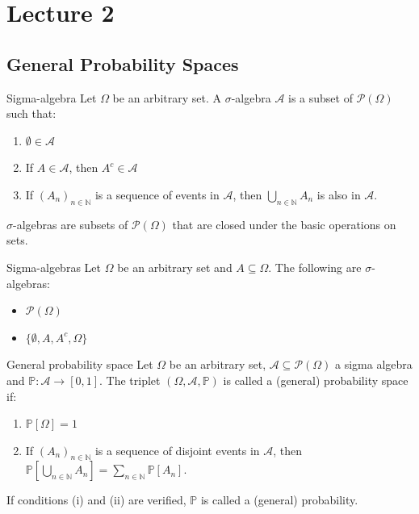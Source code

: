\documentclass[11pt, a4paper]{article}
\begin{document}

\section{Lecture 2}

\subsection{General Probability Spaces}

\begin{definition}{Sigma-algebra}{}
Let $\Omega$ be an arbitrary set. A $\sigma$-algebra $\mathscr{A}$ is a subset of $\mathcal{P}(\Omega)$ such that:
\begin{enumerate}
    \item $\emptyset \in \mathscr{A}$
    \item If $A \in \mathscr{A}$, then $A^c \in \mathscr{A}$
    \item If $(A_n)_{n \in \mathbb{N}}$ is a sequence of events in $\mathscr{A}$, then $\bigcup_{n \in \mathbb{N}} A_n$ is also in $\mathscr{A}$.
\end{enumerate}
$\sigma$-algebras are subsets of $\mathcal{P}(\Omega)$ that are closed under the basic operations on sets.
\end{definition}

\begin{example}{Sigma-algebras}{}
Let $\Omega$ be an arbitrary set and $A \subseteq \Omega$. The following are $\sigma$-algebras:
\begin{itemize}
    \item $\mathcal{P}(\Omega)$
    \item $\{\emptyset, A, A^c, \Omega\}$
\end{itemize}
\end{example}

\begin{definition}{General probability space}{}
Let $\Omega$ be an arbitrary set, $\mathscr{A} \subseteq \mathcal{P}(\Omega)$ a sigma algebra and $\mathbb{P}: \mathscr{A} \rightarrow [0,1]$. The triplet $(\Omega, \mathscr{A}, \mathbb{P})$ is called a (general) probability space if:
\begin{enumerate}
    \item $\mathbb{P}[\Omega] = 1$
    \item If $(A_n)_{n \in \mathbb{N}}$ is a sequence of disjoint events in $\mathscr{A}$, then $\mathbb{P}\left[\bigcup_{n \in \mathbb{N}} A_n\right] = \sum_{n \in \mathbb{N}} \mathbb{P}[A_n]$.
\end{enumerate}
If conditions (i) and (ii) are verified, $\mathbb{P}$ is called a (general) probability.
\end{definition}
\end{document}
